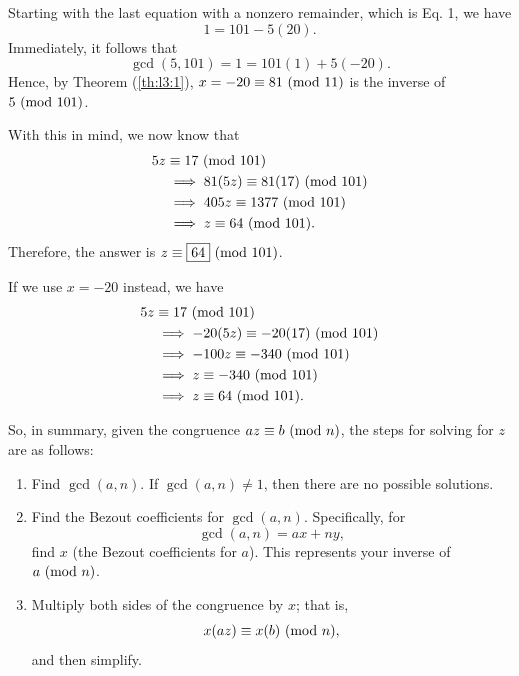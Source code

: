 \documentclass[letterpaper]{article}
\begin{document}
\begin{mdframed}
\begin{itemize}
\begin{mdframed}
            Starting with the last equation with a nonzero remainder, which is Eq. 1, we have 
            \[1 = 101 - 5(20).\]
            Immediately, it follows that 
            \[\gcd(5, 101) = 1 = 101(1) + 5(-20).\]
            Hence, by Theorem (\ref{th:l3:1}), $x = -20 \equiv 81 \ (\mathrm{mod}\ 11)$ is the inverse of $5 \ (\mathrm{mod}\ 101)$.

            \bigskip 

            With this in mind, we now know that 
            \begin{equation*}
                \begin{aligned}
                    5z &\equiv 17 \ (\mathrm{mod}\ 101) \\ 
                        &\implies 81(5z) \equiv 81(17) \ (\mathrm{mod}\ 101) \\ 
                        &\implies 405z \equiv 1377 \ (\mathrm{mod}\ 101) \\ 
                        &\implies z \equiv 64 \ (\mathrm{mod}\ 101).
                \end{aligned}
            \end{equation*}
            Therefore, the answer is $z \equiv \boxed{64} \ (\mathrm{mod}\ 101)$.

            \begin{mdframed}
                If we use $x = -20$ instead, we have 
                \begin{equation*}
                    \begin{aligned}
                        5z &\equiv 17 \ (\mathrm{mod}\ 101) \\ 
                            &\implies -20(5z) \equiv -20(17) \ (\mathrm{mod}\ 101) \\ 
                            &\implies -100z \equiv -340 \ (\mathrm{mod}\ 101) \\ 
                            &\implies z \equiv -340 \ (\mathrm{mod}\ 101) \\ 
                            &\implies z \equiv 64 \ (\mathrm{mod}\ 101).
                    \end{aligned}
                \end{equation*}
            \end{mdframed}
        \end{mdframed}
    \end{itemize}
\end{mdframed}
So, in summary, given the congruence $az \equiv b \ (\mathrm{mod}\ n)$, the steps for solving for $z$ are as follows: 
\begin{enumerate}
    \item Find $\gcd(a, n)$. If $\gcd(a, n) \neq 1$, then there are no possible solutions.
    \item Find the Bezout coefficients for $\gcd(a, n)$. Specifically, for \[\gcd(a, n) = ax + ny,\] find $x$ (the Bezout coefficients for $a$). This represents your inverse of $a \ (\mathrm{mod}\ n)$.
    \item Multiply both sides of the congruence by $x$; that is, 
    \[x(az) \equiv x(b) \ (\mathrm{mod}\ n),\]
    and then simplify.
\end{enumerate}
\end{document}
